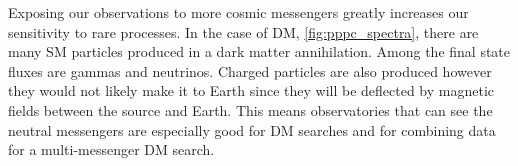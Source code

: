 \begin{figure}[h]
\end{figure}

Exposing our observations to more cosmic messengers greatly increases our sensitivity to rare processes.
In the case of DM, \cref{fig:pppc_spectra},  there are many SM particles produced in a dark matter annihilation.
Among the final state fluxes are gammas and neutrinos.
Charged particles are also produced however they would not likely make it to Earth since they will be deflected by magnetic fields between the source and Earth.
This means observatories that can see the neutral messengers are especially good for DM searches and for combining data for a multi-messenger DM search.
